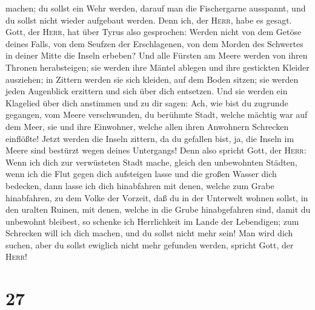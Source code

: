 machen; du sollst ein Wehr werden, darauf man die Fischergarne
ausspannt, und du sollst nicht wieder aufgebaut werden. Denn ich, der
\textsc{Herr}, habe es gesagt.  Gott, der \textsc{Herr},
hat über Tyrus also gesprochen: Werden nicht von dem Getöse deines
Falls, von dem Seufzen der Erschlagenen, von dem Morden des Schwertes in
deiner Mitte die Inseln erbeben?  Und alle Fürsten am
Meere werden von ihren Thronen herabsteigen; sie werden ihre Mäntel
ablegen und ihre gestickten Kleider ausziehen; in Zittern werden sie
sich kleiden, auf dem Boden sitzen; sie werden jeden Augenblick
erzittern und sich über dich entsetzen.  Und sie werden
ein Klagelied über dich anstimmen und zu dir sagen: Ach, wie bist du
zugrunde gegangen, vom Meere verschwunden, du berühmte Stadt, welche
mächtig war auf dem Meer, sie und ihre Einwohner, welche allen ihren
Anwohnern Schrecken einflößte!  Jetzt werden die Inseln
zittern, da du gefallen bist, ja, die Inseln im Meere sind bestürzt
wegen deines Untergangs!  Denn also spricht Gott, der
\textsc{Herr}: Wenn ich dich zur verwüsteten Stadt mache, gleich den
unbewohnten Städten, wenn ich die Flut gegen dich aufsteigen lasse und
die großen Wasser dich bedecken,  dann lasse ich dich
hinabfahren mit denen, welche zum Grabe hinabfahren, zu dem Volke der
Vorzeit, daß du in der Unterwelt wohnen sollst, in den uralten Ruinen,
mit denen, welche in die Grube hinabgefahren sind, damit du unbewohnt
bleibest, so schenke ich Herrlichkeit im Lande der Lebendigen;
 zum Schrecken will ich dich machen, und du sollst nicht
mehr sein! Man wird dich suchen, aber du sollst ewiglich nicht mehr
gefunden werden, spricht Gott, der \textsc{Herr}!

\hypertarget{section-26}{%
\section{27}\label{section-26}}

